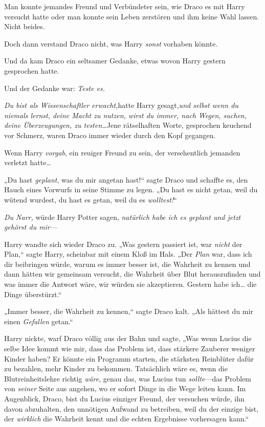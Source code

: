{Man konnte jemandes Freund und Verbündeter sein, wie Draco es mit Harry versucht hatte oder man konnte sein Leben zerstören und ihm keine Wahl lassen. Nicht beides.

Doch dann verstand Draco nicht, was Harry \emph{sonst} vorhaben könnte.

Und da kam Draco ein seltsamer Gedanke, etwas wovon Harry gestern gesprochen hatte.

Und der Gedanke war: \emph{Teste es.}

\emph{Du bist als Wissenschaftler erwacht,}hatte Harry gesagt,\emph{und selbst wenn du niemals lernst, deine Macht zu nutzen, wirst du immer, nach Wegen, suchen, deine Überzeugungen, zu testen…}Jene rätselhaften Worte, gesprochen keuchend vor Schmerz, waren Draco immer wieder durch den Kopf gegangen.

Wenn Harry \emph{vorgab}, ein reuiger Freund zu sein, der versehentlich jemanden verletzt hatte…

„Du hast \emph{geplant}, was du mir angetan hast!“ sagte Draco und schaffte es, den Hauch eines Vorwurfs in seine Stimme zu legen. „Du hast es nicht getan, weil du wütend wurdest, du hast es getan, weil du es \emph{wolltest!}“

\emph{Du Narr,} würde Harry Potter sagen, \emph{natürlich habe ich es geplant und jetzt gehörst du mir—}

Harry wandte sich wieder Draco zu. „Was gestern passiert ist, war \emph{nicht} der Plan,“ sagte Harry, scheinbar mit einem Kloß im Hals. „Der \emph{Plan} war, dass ich dir beibringen würde, warum es immer besser ist, die Wahrheit zu kennen und dann hätten wir gemeinsam versucht, die Wahrheit über Blut herauszufinden und was immer die Antwort wäre, wir würden sie akzeptieren. Gestern habe ich… die Dinge überstürzt.“

„Immer besser, die Wahrheit zu kennen,“ sagte Draco kalt. „Als hättest du mir einen \emph{Gefallen} getan.“

Harry nickte, warf Draco völlig aus der Bahn und sagte, „Was wenn Lucius die selbe Idee kommt wie mir, dass das Problem ist, dass stärkere Zauberer weniger Kinder haben? Er könnte ein Programm starten, die stärksten Reinblüter dafür zu bezahlen, mehr Kinder zu bekommen. Tatsächlich wäre es, wenn die Blutreinheitslehre richtig \emph{wäre}, genau das, was Lucius tun \emph{sollte}—das Problem von \emph{seiner} Seite aus angehen, wo er sofort Dinge in die Wege leiten kann. Im Augenblick, Draco, bist du Lucius einziger Freund, der versuchen würde, ihn davon abzuhalten, den unnötigen Aufwand zu betreiben, weil du der einzige bist, der \emph{wirklich} die Wahrheit kennt und die echten Ergebnisse vorhersagen kann.“

}
